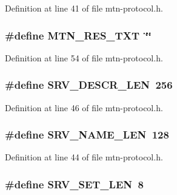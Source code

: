 Definition at line 41 of file mtn-\/protocol.h.

\hypertarget{mtn-protocol_8h_aa10ec7921d29bd9fca25c36d6e8956b6}{
\subsubsection[{MTN\_\-RES\_\-TXT}]{\setlength{\rightskip}{0pt plus 5cm}\#define MTN\_\-RES\_\-TXT~\char`\"{}\char`\"{}}}
\label{mtn-protocol_8h_aa10ec7921d29bd9fca25c36d6e8956b6}


Definition at line 54 of file mtn-\/protocol.h.

\hypertarget{mtn-protocol_8h_a383295deb5005dfbd7eee3108638474f}{
\subsubsection[{SRV\_\-DESCR\_\-LEN}]{\setlength{\rightskip}{0pt plus 5cm}\#define SRV\_\-DESCR\_\-LEN~256}}
\label{mtn-protocol_8h_a383295deb5005dfbd7eee3108638474f}


Definition at line 46 of file mtn-\/protocol.h.

\hypertarget{mtn-protocol_8h_aacfb594515b533dee748cd6bf3f8d461}{
\subsubsection[{SRV\_\-NAME\_\-LEN}]{\setlength{\rightskip}{0pt plus 5cm}\#define SRV\_\-NAME\_\-LEN~128}}
\label{mtn-protocol_8h_aacfb594515b533dee748cd6bf3f8d461}


Definition at line 44 of file mtn-\/protocol.h.

\hypertarget{mtn-protocol_8h_ad4068c695fe365b4818d7d3998fc2720}{
\subsubsection[{SRV\_\-SET\_\-LEN}]{\setlength{\rightskip}{0pt plus 5cm}\#define SRV\_\-SET\_\-LEN~8}}
\label{mtn-protocol_8h_ad4068c695fe365b4818d7d3998fc2720}


